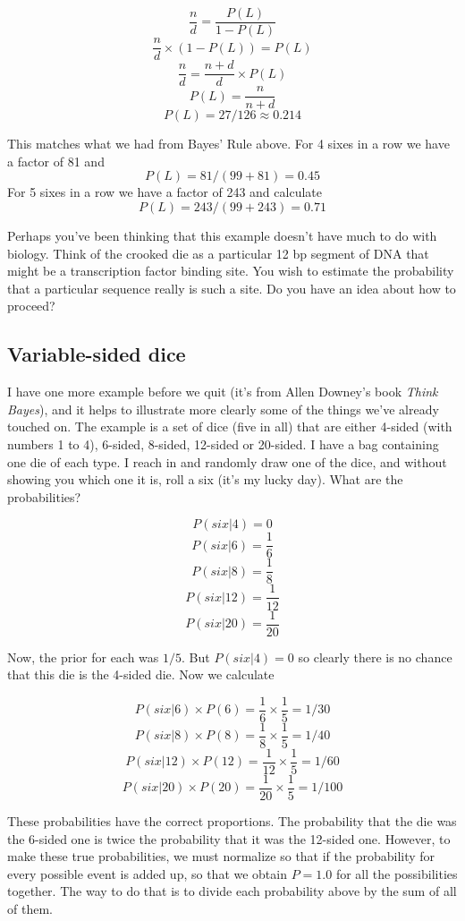 \documentclass[11pt, oneside]{article}
\begin{document}
\[ \frac{n}{d} = \frac{P(L)}{1-P(L)} \]
\[ \frac{n}{d} \times (1-P(L)) = P(L) \]
\[  \frac{n}{d} =  \frac{n+d}{d} \times P(L) \]
\[ P(L) = \frac{n}{n+d} \]
\[ P(L) = 27/126 \approx 0.214 \]

This matches what we had from Bayes' Rule above.  For 4 sixes in a row we have a factor of 81 and
\[ P(L) = 81/(99 + 81) = 0.45 \]
For 5 sixes in a row we have a factor of 243 and calculate
\[ P(L) = 243/(99 + 243) = 0.71 \]

Perhaps you've been thinking that this example doesn't have much to do with biology.  Think of the crooked die as a particular 12 bp segment of DNA that might be a transcription factor binding site.  You wish to estimate the probability that a particular sequence really is such a site.  Do you have an idea about how to proceed?

\subsection*{Variable-sided dice}

I have one more example before we quit (it's from Allen Downey's book \emph{Think Bayes}), and it helps to illustrate more clearly some of the things we've already touched on.  The example is a set of dice (five in all) that are either 4-sided (with numbers 1 to 4), 6-sided, 8-sided, 12-sided or 20-sided.  I have a bag containing one die of each type.  I reach in and randomly draw one of the dice, and without showing you which one it is, roll a six (it's my lucky day).  What are the probabilities?

\[ P(six|4) = 0  \]
\[ P(six|6) = \frac{1}{6}  \]
\[ P(six|8) = \frac{1}{8}  \]
\[ P(six|12) = \frac{1}{12}  \]
\[ P(six|20) = \frac{1}{20}  \]

Now, the prior for each was $1/5$.  But $P(six|4) = 0$ so clearly there is no chance that this die is the 4-sided die.  Now we calculate

\[ P(six|6) \times P(6) = \frac{1}{6} \times \frac{1}{5} = 1/30 \]
\[ P(six|8) \times P(8) = \frac{1}{8} \times \frac{1}{5} = 1/40 \]
\[ P(six|12) \times P(12) = \frac{1}{12} \times \frac{1}{5} = 1/60 \]
\[ P(six|20) \times P(20) = \frac{1}{20} \times \frac{1}{5} = 1/100 \]

These probabilities have the correct proportions.  The probability that the die was the 6-sided one is twice the probability that it was the 12-sided one.  However, to make these true probabilities, we must normalize so that if the probability for every possible event is added up, so that we obtain $P=1.0$ for all the possibilities together.  The way to do that is to divide each probability above by the sum of all of them.
\end{document}

